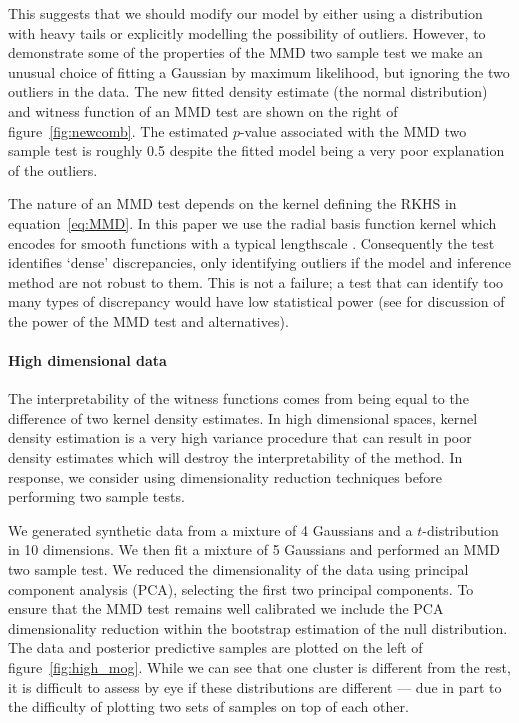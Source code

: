 \documentclass{article} %
\begin{document}
This suggests that we should modify our model by either using a distribution with heavy tails or explicitly modelling the possibility of outliers.
However, to demonstrate some of the properties of the MMD two sample test we make an unusual choice of fitting a Gaussian by maximum likelihood, but ignoring the two outliers in the data.
The new fitted density estimate (the normal distribution) and witness function of an MMD test are shown on the right of figure~\ref{fig:newcomb}.
The estimated $p$-value associated with the MMD two sample test is roughly 0.5 despite the fitted model being a very poor explanation of the outliers.

The nature of an MMD test depends on the kernel defining the RKHS in equation~\eqref{eq:MMD}.
In this paper we use the radial basis function kernel which encodes for smooth functions with a typical lengthscale \citep[e.g.][]{Rasmussen2006-ml}.
Consequently the test identifies `dense' discrepancies, only identifying outliers if the model and inference method are not robust to them.
This is not a failure; a test that can identify too many types of discrepancy would have low statistical power (see \citep{Gretton2008-ik} for discussion of the power of the MMD test and alternatives).

\paragraph{High dimensional data}

\label{sec:high_dim}

The interpretability of the witness functions comes from being equal to the difference of two kernel density estimates.
In high dimensional spaces, kernel density estimation is a very high variance procedure that can result in poor density estimates which will destroy the interpretability of the method.
In response, we consider using dimensionality reduction techniques before performing two sample tests.

We generated synthetic data from a mixture of 4 Gaussians and a $t$-distribution in 10 dimensions\footnotemark.
We then fit a mixture of 5 Gaussians and performed an MMD two sample test.
We reduced the dimensionality of the data using principal component analysis (PCA), selecting the first two principal components.
To ensure that the MMD test remains well calibrated we include the PCA dimensionality reduction within the bootstrap estimation of the null distribution.
The data and posterior predictive samples are plotted on the left of figure~\ref{fig:high_mog}.
While we can see that one cluster is different from the rest, it is difficult to assess by eye if these distributions are different --- due in part to the difficulty of plotting two sets of samples on top of each other.
\end{document}
